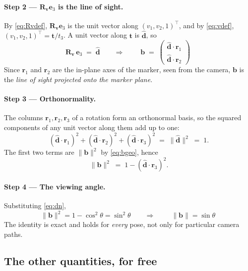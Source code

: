 \documentclass[11pt,a4paper]{article}
\theoremstyle{remark}
\newcommand{\Rvee}{\mathbf{R}_{\vvec}}
\newcommand{\bvec}{\mathbf{b}}
\newcommand{\evec}{\mathbf{e}}
\newcommand{\rvec}{\mathbf{r}}
\newcommand{\tvec}{\mathbf{t}}
\newcommand{\vvec}{\mathbf{v}}
\newcommand{\dhat}{\hat{\mathbf{d}}}
\begin{document}
\paragraph{Step 2 --- $\Rvee\evec_3$ is the line of sight.} By \eqref{eq:Rvdef},
$\Rvee\evec_3$ is the unit vector along $(v_1,v_2,1)^{\top}$, and by
\eqref{eq:vdef}, $(v_1,v_2,1)^{\top} = \tvec / t_3$. A unit vector along
$\tvec$ is $\dhat$, so
\begin{equation}
  \Rvee\,\evec_3 \;=\; \dhat
  \qquad\Longrightarrow\qquad
  \boxed{\;
  \bvec \;=\; \begin{pmatrix} \dhat\cdot\rvec_1 \\ \dhat\cdot\rvec_2 \end{pmatrix}
  \;}
  \label{eq:bgeo}
\end{equation}
Since $\rvec_1$ and $\rvec_2$ are the in-plane axes of the marker, seen from the
camera, $\bvec$ is the \emph{line of sight projected onto the marker plane}.

\paragraph{Step 3 --- Orthonormality.} The columns $\rvec_1,\rvec_2,\rvec_3$ of
a rotation form an orthonormal basis, so the squared components of any unit
vector along them add up to one:
\begin{equation}
  (\dhat\cdot\rvec_1)^2 + (\dhat\cdot\rvec_2)^2 + (\dhat\cdot\rvec_3)^2
  \;=\; \|\dhat\|^2 \;=\; 1 .
\end{equation}
The first two terms are $\|\bvec\|^2$ by \eqref{eq:bgeo}, hence
\begin{equation}
  \|\bvec\|^2 \;=\; 1 - (\dhat\cdot\rvec_3)^2 .
\end{equation}

\paragraph{Step 4 --- The viewing angle.} Substituting \eqref{eq:dn},
\begin{equation}
  \|\bvec\|^2 = 1 - \cos^2\theta = \sin^2\theta
  \qquad\Longrightarrow\qquad
  \boxed{\;\|\bvec\| = \sin\theta\;}
  \label{eq:bsin}
\end{equation}
The identity is exact and holds for \emph{every} pose, not only for particular
camera paths.

\subsection{The other quantities, for free}
\end{document}
